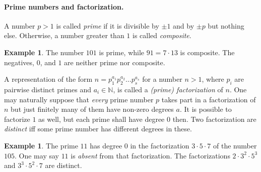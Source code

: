 \documentclass[12pt,notitlepage]{article}
\theoremstyle{plain}
\newtheorem{lemma}[thm]{Lemma}
\theoremstyle{definition}
\newtheorem{exm}[thm]{Example}
\theoremstyle{plain}
\newcommand{\N}{\mathbb{N}}
\newcommand{\1}{\mathbf{1}}
\newcommand{\0}{\mathbf{0}}
\newcommand{\dvd}{\mathop{\mid}}
\newcommand{\mcomm}[1]{}
\begin{document}
\paragraph{Prime numbers and factorization.} A number $p > 1$ is called \emph{prime} if it is divisible by $\pm 1$ and by $\pm p$ but nothing else. Otherwise, a number greater than $1$ is called \emph{composite}.

\begin{exm}
The number $101$ is prime, while $91 = 7 \cdot 13$ is composite. The negatives, $0$, and $1$ are neither prime nor composite.
\end{exm}


A representation of the form $n = p_1^{a_1} p_2^{a_2} \ldots p_s^{a_s}$ for a number $n > 1$, where $p_i$ are pairwise distinct primes and $a_i \in \N$, is called a \emph{(prime) factorization} of $n$. One may naturally suppose that \emph{every} prime number $p$ takes part in a factorization of $n$ but just finitely many of them have non-zero degrees $a$. It is possible to factorize $1$ as well, but each prime shall have degree $0$ then. Two factorization are \emph{distinct} iff some prime number has different degrees in these.

\mcomm{It would be very natural to define a factorization as a function from primes to naturals with a finite support. Unfortunately, we have not enough set theory up to this point to do so. However, the students are usually happy with these ugly notions of `distinct' factorizations etc. for those are intuitive enough.}

\begin{exm}
The prime $11$ has degree $0$ in the factorization $3 \cdot 5 \cdot 7$ of the number $105$. One may say $11$ is \emph{absent} from that factorization. The factorizations $2 \cdot 3^2 \cdot 5^3$ and $3^3 \cdot 5^2 \cdot 7$ are distinct.
\end{exm}
\end{document}
